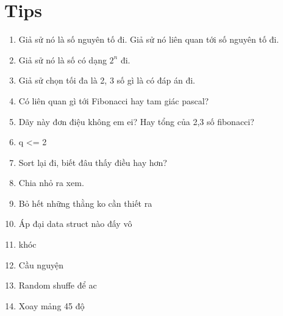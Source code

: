 \documentclass[A4 paper, 12pt]{article}
\begin{document}
	\section{Tips}
	\begin{enumerate}[topsep=0pt, partopsep=0pt, itemsep=0pt]
	\item Giả sử nó là số nguyên tố đi. Giả sử nó liên quan tới số nguyên tố đi.\\
	\item Giả sử nó là số có dạng \(2^n\) đi.\\
	\item Giả sử chọn tối đa là 2, 3 số gì là có đáp án đi.\\
	\item Có liên quan gì tới Fibonacci hay tam giác pascal?\\
	\item Dãy này đơn điệu không em ei? Hay tổng của 2,3 số fibonacci?\\
	\item q <= 2\\
	\item Sort lại đi, biết đâu thấy điều hay hơn?\\
	\item Chia nhỏ ra xem.\\
	\item Bỏ hết những thằng ko cần thiết ra\\
	\item Áp đại data struct nào đấy vô\\
	\item khóc\\
	\item Cầu nguyện\\
	\item Random shuffe để ac\\
	\item Xoay mảng 45 độ\\
	\end{enumerate}
\end{document}
